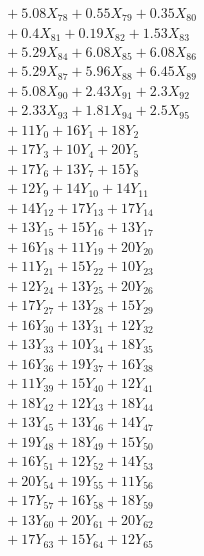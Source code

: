 \documentclass[a4paper,10pt]{article}
\begin{document}
{\begin{align}
&\;  + 5.08 X_{78} + 0.55 X_{79} + 0.35 X_{80} \\[0.3ex]
&\;  + 0.4 X_{81} + 0.19 X_{82} + 1.53 X_{83} \\[0.3ex]
&\;  + 5.29 X_{84} + 6.08 X_{85} + 6.08 X_{86} \\[0.3ex]
&\;  + 5.29 X_{87} + 5.96 X_{88} + 6.45 X_{89} \\[0.5ex]\allowbreak
&\;  + 5.08 X_{90} + 2.43 X_{91} + 2.3 X_{92} \\[0.3ex]
&\;  + 2.33 X_{93} + 1.81 X_{94} + 2.5 X_{95} \\[0.3ex]
&\;  + 11 Y_{0} + 16 Y_{1} + 18 Y_{2} \\[0.3ex]
&\;  + 17 Y_{3} + 10 Y_{4} + 20 Y_{5} \\[0.3ex]
&\;  + 17 Y_{6} + 13 Y_{7} + 15 Y_{8} \\[0.3ex]
&\;  + 12 Y_{9} + 14 Y_{10} + 14 Y_{11} \\[0.3ex]
&\;  + 14 Y_{12} + 17 Y_{13} + 17 Y_{14} \\[0.3ex]
&\;  + 13 Y_{15} + 15 Y_{16} + 13 Y_{17} \\[0.3ex]
&\;  + 16 Y_{18} + 11 Y_{19} + 20 Y_{20} \\[0.3ex]
&\;  + 11 Y_{21} + 15 Y_{22} + 10 Y_{23} \\[0.5ex]\allowbreak
&\;  + 12 Y_{24} + 13 Y_{25} + 20 Y_{26} \\[0.3ex]
&\;  + 17 Y_{27} + 13 Y_{28} + 15 Y_{29} \\[0.3ex]
&\;  + 16 Y_{30} + 13 Y_{31} + 12 Y_{32} \\[0.3ex]
&\;  + 13 Y_{33} + 10 Y_{34} + 18 Y_{35} \\[0.3ex]
&\;  + 16 Y_{36} + 19 Y_{37} + 16 Y_{38} \\[0.3ex]
&\;  + 11 Y_{39} + 15 Y_{40} + 12 Y_{41} \\[0.3ex]
&\;  + 18 Y_{42} + 12 Y_{43} + 18 Y_{44} \\[0.3ex]
&\;  + 13 Y_{45} + 13 Y_{46} + 14 Y_{47} \\[0.3ex]
&\;  + 19 Y_{48} + 18 Y_{49} + 15 Y_{50} \\[0.3ex]
&\;  + 16 Y_{51} + 12 Y_{52} + 14 Y_{53} \\[0.5ex]\allowbreak
&\;  + 20 Y_{54} + 19 Y_{55} + 11 Y_{56} \\[0.3ex]
&\;  + 17 Y_{57} + 16 Y_{58} + 18 Y_{59} \\[0.3ex]
&\;  + 13 Y_{60} + 20 Y_{61} + 20 Y_{62} \\[0.3ex]
&\;  + 17 Y_{63} + 15 Y_{64} + 12 Y_{65} \\[0.3ex]

\end{align}}
\end{document}
